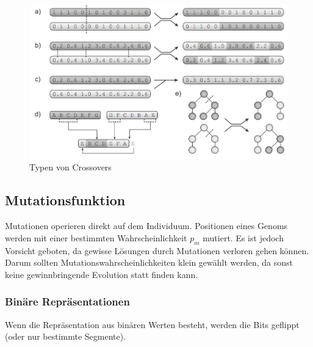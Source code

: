       \begin{figure}[H]
        \includegraphics[scale=0.7, center]{graphics/crossover_types}
        \caption{Typen von Crossovers\cite[S.27]{book:bioInspired}\label{fig:crossTypes}}
      \end{figure}

    \subsection{Mutationsfunktion}

      Mutationen operieren direkt auf dem Individuum.
      Positionen eines Genoms werden mit einer bestimmten Wahrscheinlichkeit \(p_{m}\) mutiert.
      Es ist jedoch Vorsicht geboten, da gewisse Lösungen durch Mutationen verloren gehen können.
      Darum sollten Mutationswahrscheinlichkeiten klein gewählt werden, da sonst keine gewinnbringende Evolution statt finden kann.

      \subsubsection{Binäre Repräsentationen}

        Wenn die Repräsentation aus binären Werten besteht, werden die Bits geflippt (oder nur bestimmte Segmente).

